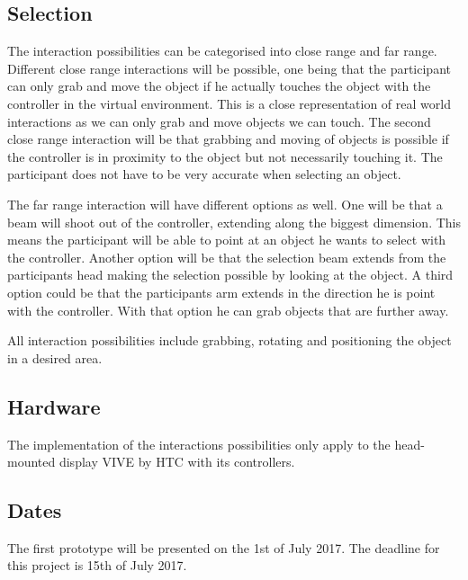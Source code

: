 \documentclass[a4paper, 12pt]{article}
\begin{document}
\subsection{Selection}
The interaction possibilities can be categorised into close range and far range. Different close range interactions will be possible, one being that the participant can only grab and move the object if he actually touches the object with the controller in the virtual environment. This is a close representation of real world interactions as we can only grab and move objects we can touch. 
The second close range interaction will be that grabbing and moving of objects is possible if the controller is in proximity to the object but not necessarily touching it. The participant does not have to be very accurate when selecting an object. 

The far range interaction will have different options as well. One will be that a beam will shoot out of the controller, extending along the biggest dimension. This means the participant will be able to point at an object he wants to select with the controller. 
Another option will be that the selection beam extends from the participants head making the selection possible by looking at the object. 
A third option could be that the participants arm extends in the direction he is point with the controller. With that option he can grab objects that are further away. 

All interaction possibilities include grabbing, rotating and positioning the object in a desired area.  

\subsection{Hardware}

The implementation of the interactions possibilities only apply to the head-mounted display VIVE by HTC with its controllers. 

\subsection{Dates}

The first prototype will be presented on the 1st of July 2017. The deadline for this project is 15th of July 2017.

\newpage


\end{document}
